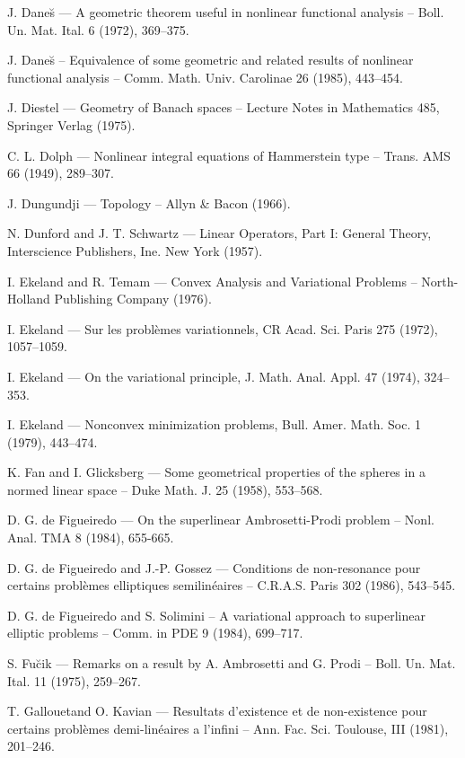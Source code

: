 \begin{thebibliography}{}
 J. Dane\u{s} --- A geometric theorem useful in
  nonlinear functional analysis -- Boll. Un. Mat. Ital. 6 (1972),
  369--375. 

 J. Dane\u{s} -- Equivalence of some geometric and
  related results of nonlinear functional analysis --
  Comm. Math. Univ. Carolinae 26 (1985), 443--454.

 J. Diestel --- Geometry of Banach spaces -- Lecture
  Notes in Mathematics 485, Springer Verlag (1975).

 C. L. Dolph --- Nonlinear integral equations of
  Hammerstein type -- Trans. AMS 66 (1949), 289--307.

 J. Dungundji --- Topology -- Allyn \& Bacon (1966).

 N. Dunford and J. T. Schwartz --- Linear Operators,
  Part I: General Theory, Interscience Publishers, Ine. New York
  (1957). 

 I. Ekeland and R. Temam --- Convex Analysis and
  Variational Problems -- North-Holland Publishing Company (1976).

 I. Ekeland --- Sur les probl\`emes variationnels, CR
  Acad. Sci. Paris 275 (1972), 1057--1059.

 I. Ekeland --- On the variational principle,
  J. Math. Anal. Appl. 47 (1974), 324--353.

 I. Ekeland --- Nonconvex minimization problems,
  Bull. Amer. Math. Soc. 1 (1979), 443--474.

 K. Fan and I. Glicksberg --- Some geometrical
  properties of the spheres in a normed linear space -- Duke
  Math. J. 25 (1958), 553--568.

 D. G. de Figueiredo --- On the superlinear
  Ambrosetti-Prodi problem -- Nonl. Anal. TMA 8 (1984), 655-665.

 D. G. de Figueiredo and J.-P. Gossez --- Conditions de
  non-resonance pour certains probl\`emes elliptiques semilin\'eaires
  -- C.R.A.S. Paris 302 (1986), 543--545.

 D. G. de Figueiredo and S. Solimini -- A variational
  approach to superlinear elliptic problems -- Comm. in PDE 9 (1984),
  699--717. 

 S. Fu\u{c}ik --- Remarks on a result by A. Ambrosetti
  and G. Prodi -- Boll. Un. Mat. Ital. 11 (1975), 259--267.

 T. Gallouet\pageoriginale and O. Kavian --- Resultats
  d'existence et de non-existence pour certains probl\`emes
  demi-lin\'eaires a l'infini -- Ann. Fac. Sci. Toulouse, III (1981),
  201--246. 


\end{thebibliography}
